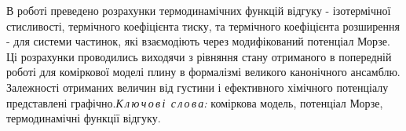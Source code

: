 \documentclass[fleqn,twoside,twocolumn,nofootinbib,showkeys]{revtex4} %
\begin{document}
	\vspace*{-5mm} {В роботі преведено розрахунки термодинамічних функцій відгуку - ізотермічної стисливості, термічного коефіцієнта тиску, та термічного коефіцієнта розширення - для системи частинок, які взаємодіють через модифікований потенціал Морзе. Ці розрахунки проводились виходячи з рівняння стану отриманого в попередній роботі для коміркової моделі плину в формалізмі великого канонічного ансамблю. Залежності отриманих величин від густини і ефективного хімічного потенціалу представлені графічно.}{\textit{К\,л\,ю\,ч\,о\,в\,і\,
			с\,л\,о\,в\,а:} коміркова модель, потенціал Морзе, термодинамічні функції відгуку.}
	
\end{document}
